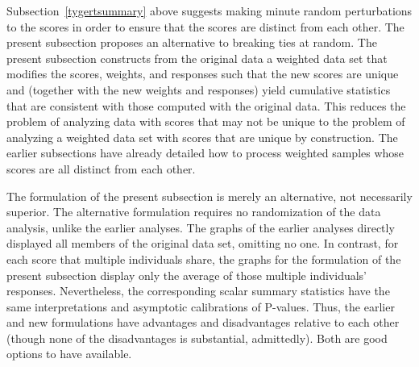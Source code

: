 \documentclass[12pt]{article}
\begin{document}
Subsection~\ref{tygertsummary} above suggests making minute
random perturbations to the scores in order to ensure that the scores
are distinct from each other.
The present subsection proposes an alternative to breaking ties at random.
The present subsection constructs from the original data
a weighted data set that modifies the scores, weights, and responses
such that the new scores are unique and
(together with the new weights and responses) yield cumulative statistics
that are consistent with those computed with the original data.
This reduces the problem of analyzing data with scores that may not be unique
to the problem of analyzing a weighted data set with scores that are unique
by construction. The earlier subsections have already detailed
how to process weighted samples whose scores are all distinct from each other.

The formulation of the present subsection is merely an alternative,
not necessarily superior.
The alternative formulation requires no randomization of the data analysis,
unlike the earlier analyses.
The graphs of the earlier analyses directly displayed all members
of the original data set, omitting no one.
In contrast, for each score that multiple individuals share,
the graphs for the formulation of the present subsection display
only the average of those multiple individuals' responses.
Nevertheless, the corresponding scalar summary statistics
have the same interpretations and asymptotic calibrations of P-values.
Thus, the earlier and new formulations have advantages and disadvantages
relative to each other (though none of the disadvantages is substantial,
admittedly). Both are good options to have available.
\end{document}
